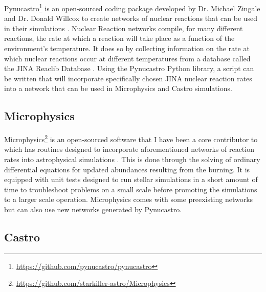 \documentclass[preprint]{aastex62}
\begin{document}
    Pynucastro\footnote{\url{https://github.com/pynucastro/pynucastro}} is an open-sourced coding package developed by Dr. Michael Zingale and Dr. Donald Willcox to create networks of nuclear reactions that can be used in their simulations \citep{pynucastro}. Nuclear Reaction networks compile, for many different reactions, the rate at which a reaction will take place as a function of the environment's temperature. It does so by collecting information on the rate at which nuclear reactions occur at different temperatures from a database called the JINA Reaclib Database \citep{JINA}. Using the Pynucastro Python library, a script can be written that will incorporate specifically chosen JINA nuclear reaction rates into a network that can be used in Microphysics and Castro simulations.
  
  \subsection{Microphysics}
  
    Microphysics\footnote{\url{https://github.com/starkiller-astro/Microphysics}} is an open-sourced software that I have been a core contributor to which has routines designed to incorporate aforementioned networks of reaction rates into astrophysical simulations \citep{Microphysics}. This is done through the solving of ordinary differential equations for updated abundances resulting from the burning. It is equipped with unit tests designed to run stellar simulations in a short amount of time to troubleshoot problems on a small scale before promoting the simulations to a larger scale operation. Microphysics comes with some preexisting networks but can also use new networks generated by Pynucastro. 
  
     
  
  \subsection{Castro}
  
\end{document}
